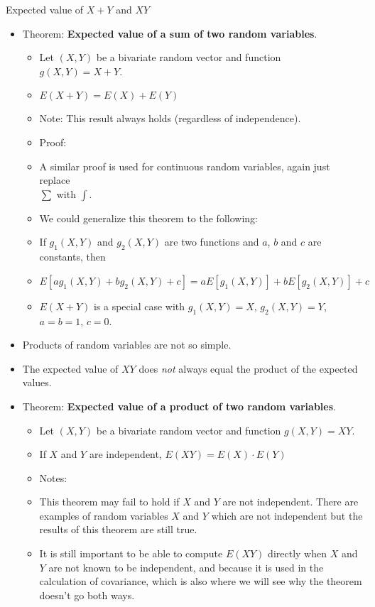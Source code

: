 \documentclass{article}
\begin{document}
Expected value of $X + Y$ and $XY$\bigskip
\begin{itemize}
    \item Theorem: \textbf{Expected value of a sum of two random variables}.\bigskip
    \begin{itemize}
        \item Let $(X,Y)$ be a bivariate random vector and function $g(X,Y) = X + Y$.
        \item[] $E(X + Y) = E(X) + E(Y)$\smallskip
        \item[] Note: This result always holds (regardless of independence).\bigskip
        \item Proof:\vspace{190pt}
        \item[] A similar proof is used for continuous random variables, again just replace \\$\sum$ with $\int$.
        \item We could generalize this theorem to the following:\bigskip
        \item[] If $g_1(X,Y)$ and $g_2(X,Y)$ are two functions and $a$, $b$ and $c$ are constants, then
        \item[] $E[ag_1(X,Y) + bg_2(X,Y) + c] = aE[g_1(X,Y)] + bE[g_2(X,Y)] + c$\\
        \item $E(X + Y)$ is a special case with $g_1(X,Y) = X$, $g_2(X,Y) = Y$, $a = b = 1$, $c = 0$.
    \end{itemize}\bigskip
    \item Products of random variables are not so simple.
    \item[] The expected value of $XY$ does \textit{not} always equal the product of the expected values.\bigskip
    \item Theorem: \textbf{Expected value of a product of two random variables}.\bigskip
    \begin{itemize}
        \item Let $(X,Y)$ be a bivariate random vector and function $g(X,Y) = XY$.
        \item[] If $X$ and $Y$ are independent, $E(XY) = E(X) \cdot E(Y)$\smallskip
        \item Notes:
        \item[] This theorem may fail to hold if $X$ and $Y$ are not independent. There are examples of random variables $X$ and $Y$ which are not independent but the results of this theorem are still true.\vspace{40pt}
        \item[] It is still important to be able to compute $E(XY)$ directly when $X$ and $Y$ are not known to be independent, and because it is used in the calculation of covariance, which is also where we will see why the theorem doesn't go both ways.
    \end{itemize}
\end{itemize}\bigskip
\end{document}
